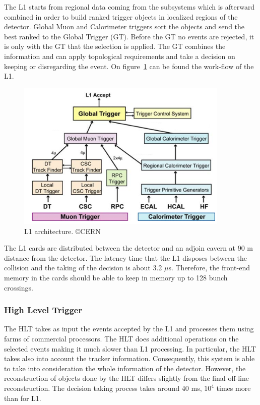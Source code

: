 The L1 starts from regional data coming from the subsystems which is afterward combined in order to build ranked trigger objects in localized regions of the detector. Global Muon and Calorimeter triggers sort the objects and send the best ranked to the Global Trigger (GT). Before the GT no events are rejected, it is only with the GT that the selection is applied. The GT combines the information and can apply topological requirements and take a decision on keeping or disregarding the event. On figure~\ref{fig:l1} can be found the work-flow of the L1. 

\begin{figure}[!Hhtbp]
  \begin{center}
    \includegraphics[width=0.9\textwidth]{figs/img_l1.png}
    \caption{L1 architecture. \copyright CERN}
    \label{fig:l1}
  \end{center}
\end{figure}

The L1 cards are distributed between the detector and an adjoin cavern at 90 m distance from the detector. The latency time that the L1 disposes between the collision and the taking of the decision is about 3.2 $\mu$s. Therefore, the front-end memory in the cards should be able to keep in memory up to 128 bunch crossings. 

\subsubsection{High Level Trigger}
\label{sec:HLT}

The HLT takes as input the events accepted by the L1 and processes them using farms of commercial processors. The HLT does additional operations on the selected events making it much slower than L1 processing. In particular, the HLT takes also into account the tracker information. Consequently, this system is able to take into consideration the whole information of the detector. However, the reconstruction of objects done by the HLT differs slightly from the final off-line reconstruction. The decision taking process takes around 40 ms, $10^{4}$ times more than for L1. 

